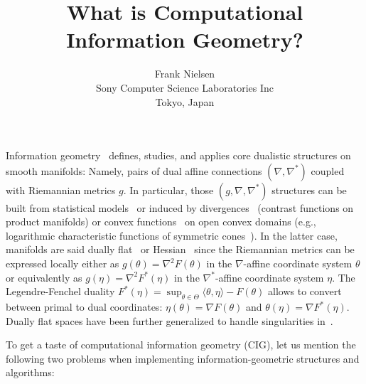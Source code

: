 \documentclass[11pt]{article}
\title{What is Computational Information Geometry?}
\author{Frank Nielsen\\ Sony Computer Science Laboratories Inc\\ Tokyo, Japan}
\date{}
\begin{document}
 \maketitle

\def\inner#1#2{\langle #1,#2\rangle}

Information geometry~\cite{IG-2016} defines, studies, and applies core dualistic structures on smooth manifolds: Namely, pairs of dual affine connections $(\nabla,\nabla^*)$ coupled with Riemannian metrics $g$. 
In particular, those $(g,\nabla,\nabla^*)$ structures can be built from statistical models~\cite{IG-2016} or induced by divergences~\cite{DIV-2010} (contrast functions on product manifolds) or  convex functions~\cite{Shima-2007} on open convex domains (e.g., logarithmic characteristic functions of symmetric cones~\cite{JordanAlgebraConnectionSymCone-2004,OharaEguchi-2014}).
In the latter case, manifolds are said dually flat~\cite{IG-2016} or Hessian~\cite{Shima-2007} since the Riemannian metrics can be expressed locally either as $g(\theta)=\nabla^2 F(\theta)$ in the $\nabla$-affine coordinate system $\theta$ or equivalently as $g(\eta)=\nabla^2 F^*(\eta)$ in the $\nabla^*$-affine coordinate system $\eta$. 
The Legendre-Fenchel duality 
$F^*(\eta)=\sup_{\theta\in\Theta} \inner{\theta}{\eta}-F(\theta)$ allows to convert between primal to dual coordinates: $\eta(\theta)=\nabla F(\theta)$ and $\theta(\eta)=\nabla F^*(\eta)$.
Dually flat spaces have been further generalized to handle singularities in~\cite{SingularDFS-2021}.

To get a taste of computational information geometry (CIG), let us mention 
 the following two problems when implementing information-geometric structures and algorithms:
 
\end{document}
